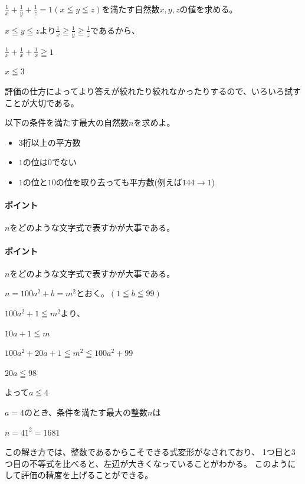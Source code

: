 \documentclass[uplatex,dvipdfmx]{jsbook}
\begin{document}
\begin{problem}[例題]
    $\displaystyle\frac{1}{x}+\frac{1}{y}+\frac{1}{z}=1\left(x\leqq y\leqq z\right)$を満たす自然数$x,y,z$の値を求める。

    $x\leqq y\leqq z$より$\displaystyle\frac{1}{x}\geqq\frac{1}{y}\geqq\frac{1}{z}$であるから、

    $\displaystyle\frac{1}{x}+\frac{1}{x}+\frac{1}{x}\geqq 1$

    $x\leqq 3$
\end{problem}

評価の仕方によってより答えが絞れたり絞れなかったりするので、いろいろ試すことが大切である。

\begin{problem}[練習問題]
    以下の条件を満たす最大の自然数$n$を求めよ。
    \begin{itemize}
        \item $3$桁以上の平方数
        \item $1$の位は$0$でない
        \item $1$の位と$10$の位を取り去っても平方数(例えば$144\rightarrow 1$)
    \end{itemize}
\end{problem}

\paragraph{ポイント}$n$をどのような文字式で表すかが大事である。

\paragraph{ポイント}$n$をどのような文字式で表すかが大事である。

\begin{answer}
    $n=100a^2+b=m^2$とおく。$\left(1\leqq b \leqq 99\right)$

    $100a^2+1 \leqq m^2$より、

    $10a+1 \leqq m$

    $100a^2+20a+1 \leqq m^2 \leqq 100a^2+99$

    $20a \leqq 98$

    よって$a\leqq 4$

    $a=4$のとき、条件を満たす最大の整数$n$は

    $n=41^2=1681$

    この解き方では、整数であるからこそできる式変形がなされており、
    1つ目と3つ目の不等式を比べると、左辺が大きくなっていることがわかる。
    このようにして評価の精度を上げることができる。
\end{answer}
\end{document}
